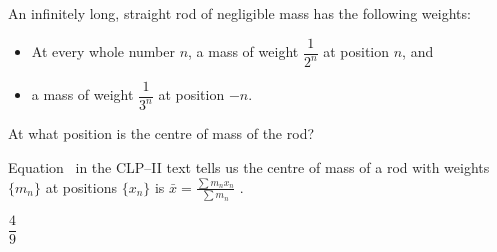 \begin{Mquestion}
An infinitely long, straight rod of negligible mass has the following weights:
\begin{itemize}
\item At every whole number $n$, a mass of weight $\dfrac{1}{2^n}$ at position $n$, and
\item a mass of weight $\dfrac{1}{3^n}$ at position $-n$.
\end{itemize}
At what position is the centre of mass of the rod?
\begin{center}
\end{center}

\end{Mquestion}
\begin{hint}
Equation~ in the CLP--II text tells us the centre of mass of a rod with weights $\{m_n\}$ at positions $\{x_n\}$ is $\displaystyle\bar x =\frac{\sum m_nx_n}{\sum m_n}$ .
\end{hint}
\begin{answer}
	$\dfrac{4}{9}$
\end{answer}
